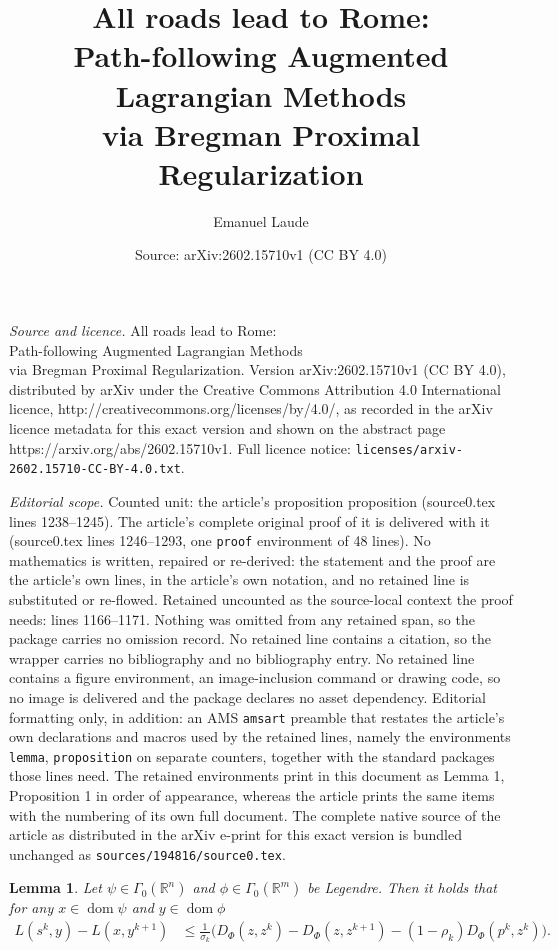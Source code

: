 \documentclass[10pt,a4paper]{amsart}
\title{All roads lead to Rome: \\ Path-following Augmented Lagrangian Methods \\ via Bregman Proximal Regularization}
\author{Emanuel Laude}
\date{Source: arXiv:2602.15710v1 (CC BY 4.0)}
\newtheorem{lemma}{Lemma}
\newcommand{\bR}{\mathbb{R}}
\DeclareMathOperator{\dom}{dom}
\begin{document}
\maketitle

\noindent\emph{Source and licence.} All roads lead to Rome: \\ Path-following Augmented Lagrangian Methods \\ via Bregman Proximal Regularization. Version arXiv:2602.15710v1 (CC BY 4.0), distributed by arXiv under the Creative Commons Attribution 4.0 International licence, http://creativecommons.org/licenses/by/4.0/, as recorded in the arXiv licence metadata for this exact version and shown on the abstract page https://arxiv.org/abs/2602.15710v1. Full licence notice: \texttt{licenses/arxiv-2602.15710-CC-BY-4.0.txt}.\par\smallskip

\noindent\textit{Editorial scope.} Counted unit: the article's proposition proposition (source0.tex lines 1238--1245). The article's complete original proof of it is delivered with it (source0.tex lines 1246--1293, one \texttt{proof} environment of 48 lines). No mathematics is written, repaired or re-derived: the statement and the proof are the article's own lines, in the article's own notation, and no retained line is substituted or re-flowed.  Retained uncounted as the source-local context the proof needs: lines 1166--1171.  Nothing was omitted from any retained span, so the package carries no omission record.  No retained line contains a citation, so the wrapper carries no bibliography and no bibliography entry.  No retained line contains a figure environment, an image-inclusion command or drawing code, so no image is delivered and the package declares no asset dependency.  Editorial formatting only, in addition: an AMS \texttt{amsart} preamble that restates the article's own declarations and macros used by the retained lines, namely the environments \texttt{lemma}, \texttt{proposition} on separate counters, together with the standard packages those lines need.  The retained environments print in this document as Lemma 1, Proposition 1 in order of appearance, whereas the article prints the same items with the numbering of its own full document.  The complete native source of the article as distributed in the arXiv e-print for this exact version is bundled unchanged as \texttt{sources/194816/source0.tex}.
\begin{lemma} \label{thm:ergodic_pd_fixed}
    Let $\psi \in \Gamma_0(\bR^n)$ and $\phi \in \Gamma_0(\bR^m)$ be Legendre. Then it holds that for any $x \in \dom \psi$ and $y \in \dom \phi$
\begin{align}
    L(s^{k}, y) -L(x, y^{k+1})&\leq \tfrac{1}{\sigma_k}\big(D_\Phi(z,z^k) -  D_\Phi(z,z^{k+1}) - (1-\rho_k) D_\Phi(p^k,z^{k})\big).
\end{align}
\end{lemma}
\end{document}
